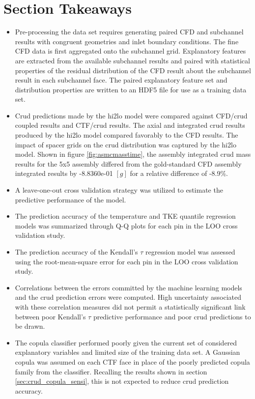 \section{Section Takeaways}


\begin{itemize}
	\item Pre-processing the data set requires generating paired CFD and subchannel results with congruent geometries and inlet boundary conditions.  The fine CFD data is first aggregated onto the subchannel grid.  Explanatory features are extracted from the available subchannel results and paired with statistical properties of the residual distribution of the CFD result about the subchannel result in each subchannel face. The paired explanatory feature set and distribution properties are written to an HDF5 file for use as a training data set.
    \item Crud predictions made by the hi2lo model were compared against CFD/crud coupled results and CTF/crud results.  The axial and integrated crud results produced by the hi2lo model compared favorably to the CFD results.  The impact of spacer grids on the crud distribution was captured by the hi2lo model.  Shown in figure \ref{fig:asmcmasstime}, the assembly integrated crud mass results for the 5x5 assembly differed from the gold-standard CFD assembly integrated results by -8.8360e-01 $[g]$ for a relative difference of -8.9\%.
    \item A leave-one-out cross validation strategy was utilized to estimate the predictive performance of the model.
    \item The prediction accuracy of the temperature and TKE quantile regression models was summarized through Q-Q plots for each pin in the LOO cross validation study.
    \item The prediction accuracy of the Kendall's $\tau$ regression model was assessed using the root-mean-square error for each pin in the LOO cross validation study.  \item Correlations between the errors committed by the machine learning models and the crud prediction errors were computed.  High uncertainty associated with these correlation measures did not permit a statistically significant link between poor Kendall's $\tau$ predictive performance and poor crud predictions to be drawn.
    \item The copula classifier performed poorly given the current set of considered explanatory variables and limited size of the training data set.  A Gaussian copula was assumed on each CTF face in place of the poorly predicted copula family from the classifier.  Recalling the results shown in section \ref{sec:crud_copula_sensi}, this is not expected to reduce crud prediction accuracy.
\end{itemize}
